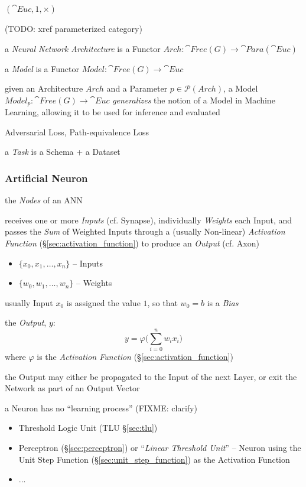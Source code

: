 $(\cat{Euc}, 1, \times)$

(TODO: xref parameterized category)

a \emph{Neural Network Architecture} is a Functor
$Arch : \cat{Free}(G) \rightarrow \cat{Para}(\cat{Euc})$

a \emph{Model} is a Functor $Model : \cat{Free}(G) \rightarrow \cat{Euc}$

given an Architecture $Arch$ and a Parameter $p \in \mathcal{P}(Arch)$, a Model
$Model_p : \cat{Free}(G) \rightarrow \cat{Euc}$ \emph{generalizes} the notion of
a Model in Machine Learning, allowing it to be used for inference and evaluated

Adversarial Loss, Path-equivalence Loss

a \emph{Task} is a Schema + a Dataset



\subsubsection{Artificial Neuron}\label{sec:artificial_neuron}

the \emph{Nodes} of an ANN

receives one or more \emph{Inputs} (cf. Synapse), individually \emph{Weights}
each Input, and passes the \emph{Sum} of Weighted Inputs through a (usually
Non-linear) \emph{Activation Function} (\S\ref{sec:activation_function}) to
produce an \emph{Output} (cf. Axon)

\begin{itemize}
  \item $\{ x_0, x_1, \ldots, x_n \}$ -- Inputs
  \item $\{ w_0, w_1, \ldots, w_n \}$ -- Weights
\end{itemize}

usually Input $x_0$ is assigned the value $1$, so that $w_0 = b$ is a
\emph{Bias}

the \emph{Output}, $y$:
\[
  y = \varphi \Big( \sum_{i=0}^n w_i x_i \Big)
\]
where $\varphi$ is the \emph{Activation Function}
(\S\ref{sec:activation_function})

the Output may either be propagated to the Input of the next Layer, or exit the
Network as part of an Output Vector

a Neuron has no ``learning process'' (FIXME: clarify)

\begin{itemize}
  \item Threshold Logic Unit (TLU \S\ref{sec:tlu})
  \item Perceptron (\S\ref{sec:perceptron}) or ``\emph{Linear Threshold Unit}''
    -- Neuron using the Unit Step Function (\S\ref{sec:unit_step_function}) as
    the Activation Function
  \item ...
\end{itemize}



